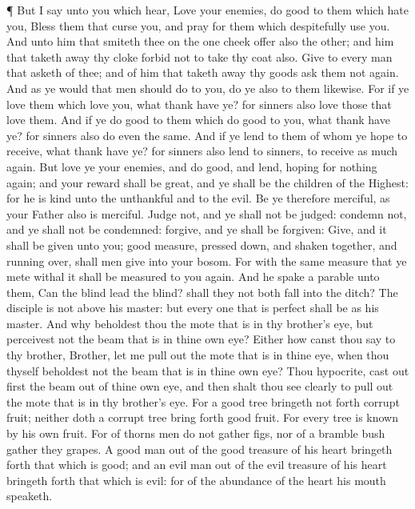  ¶ But I say unto you which hear, Love your enemies, do
good to them which hate you,  Bless them that curse you,
and pray for them which despitefully use you.  And unto him
that smiteth thee on the one cheek offer also the other; and him that
taketh away thy cloke forbid not to take thy coat also. 
Give to every man that asketh of thee; and of him that taketh away thy
goods ask them not again.  And as ye would that men should
do to you, do ye also to them likewise.  For if ye love
them which love you, what thank have ye? for sinners also love those
that love them.  And if ye do good to them which do good to
you, what thank have ye? for sinners also do even the same.
 And if ye lend to them of whom ye hope to receive, what
thank have ye? for sinners also lend to sinners, to receive as much
again.  But love ye your enemies, and do good, and lend,
hoping for nothing again; and your reward shall be great, and ye shall
be the children of the Highest: for he is kind unto the unthankful and
to the evil.  Be ye therefore merciful, as your Father also
is merciful.  Judge not, and ye shall not be judged:
condemn not, and ye shall not be condemned: forgive, and ye shall be
forgiven:  Give, and it shall be given unto you; good
measure, pressed down, and shaken together, and running over, shall men
give into your bosom. For with the same measure that ye mete withal it
shall be measured to you again.  And he spake a parable
unto them, Can the blind lead the blind? shall they not both fall into
the ditch?  The disciple is not above his master: but every
one that is perfect shall be as his master.  And why
beholdest thou the mote that is in thy brother's eye, but perceivest not
the beam that is in thine own eye?  Either how canst thou
say to thy brother, Brother, let me pull out the mote that is in thine
eye, when thou thyself beholdest not the beam that is in thine own eye?
Thou hypocrite, cast out first the beam out of thine own eye, and then
shalt thou see clearly to pull out the mote that is in thy brother's
eye.  For a good tree bringeth not forth corrupt fruit;
neither doth a corrupt tree bring forth good fruit.  For
every tree is known by his own fruit. For of thorns men do not gather
figs, nor of a bramble bush gather they grapes.  A good man
out of the good treasure of his heart bringeth forth that which is good;
and an evil man out of the evil treasure of his heart bringeth forth
that which is evil: for of the abundance of the heart his mouth
speaketh.

